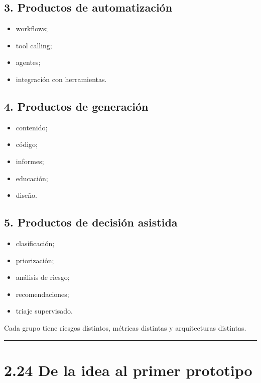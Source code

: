 \subsection{3. Productos de
automatización}\label{productos-de-automatizaciuxf3n}

\begin{itemize}
\tightlist
\item
  workflows;
\item
  tool calling;
\item
  agentes;
\item
  integración con herramientas.
\end{itemize}

\subsection{4. Productos de
generación}\label{productos-de-generaciuxf3n}

\begin{itemize}
\tightlist
\item
  contenido;
\item
  código;
\item
  informes;
\item
  educación;
\item
  diseño.
\end{itemize}

\subsection{5. Productos de decisión
asistida}\label{productos-de-decisiuxf3n-asistida}

\begin{itemize}
\tightlist
\item
  clasificación;
\item
  priorización;
\item
  análisis de riesgo;
\item
  recomendaciones;
\item
  triaje supervisado.
\end{itemize}

Cada grupo tiene riesgos distintos, métricas distintas y arquitecturas
distintas.

\begin{center}\rule{0.5\linewidth}{0.5pt}\end{center}

\section{2.24 De la idea al primer
prototipo}\label{de-la-idea-al-primer-prototipo}

